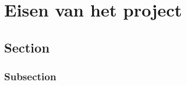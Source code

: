 \chapter{Eisen van het project}
\label{Eisen_van_het_project}

\section{Section}

\subsection{Subsection}

